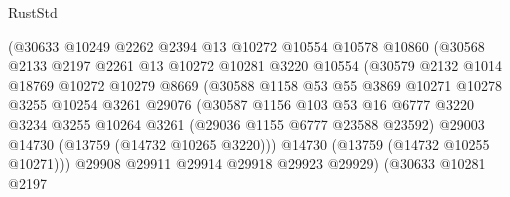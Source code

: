 \begin{lexlean}{RustStd}
\begin{coremodule}
                            (@30633
                              @10249
                              @2262
                              @2394
                              @13
                              @10272
                              @10554
                              @10578
                              @10860
                              (@30568
                                @2133
                                @2197
                                @2261
                                @13
                                @10272
                                @10281
                                @3220
                                @10554
                                (@30579
                                  @2132
                                  @1014
                                  @18769
                                  @10272
                                  @10279
                                  @8669
                                  (@30588
                                    @1158
                                    @53
                                    @55
                                    @3869
                                    @10271
                                    @10278
                                    @3255
                                    @10254
                                    @3261
                                    @29076
                                    (@30587
                                      @1156
                                      @103
                                      @53
                                      @16
                                      @6777
                                      @3220
                                      @3234
                                      @3255
                                      @10264
                                      @3261
                                      (@29036 @1155 @6777 @23588 @23592)
                                      @29003
                                      @14730
                                      (@13759 (@14732 @10265 @3220)))
                                    @14730
                                    (@13759 (@14732 @10255 @10271)))
                                  @29908
                                  @29911
                                  @29914
                                  @29918
                                  @29923
                                  @29929)
                                (@30633
                                  @10281
                                  @2197

\end{coremodule}
\end{lexlean}
